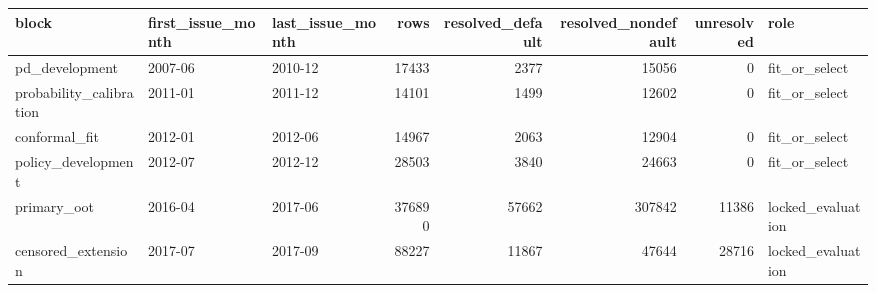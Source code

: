 \begin{tabular}{lllrrrrl}
\toprule
block & first\_issue\_month & last\_issue\_month & rows & resolved\_default & resolved\_nondefault & unresolved & role \\
\midrule
pd\_development & 2007-06 & 2010-12 & 17433 & 2377 & 15056 & 0 & fit\_or\_select \\
probability\_calibration & 2011-01 & 2011-12 & 14101 & 1499 & 12602 & 0 & fit\_or\_select \\
conformal\_fit & 2012-01 & 2012-06 & 14967 & 2063 & 12904 & 0 & fit\_or\_select \\
policy\_development & 2012-07 & 2012-12 & 28503 & 3840 & 24663 & 0 & fit\_or\_select \\
primary\_oot & 2016-04 & 2017-06 & 376890 & 57662 & 307842 & 11386 & locked\_evaluation \\
censored\_extension & 2017-07 & 2017-09 & 88227 & 11867 & 47644 & 28716 & locked\_evaluation \\
\bottomrule
\end{tabular}

